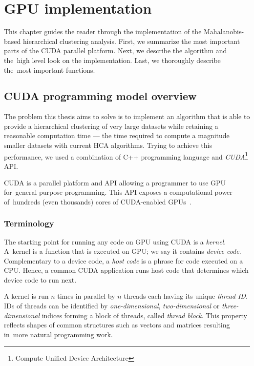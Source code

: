 \chapter{GPU implementation}

This chapter guides the reader through the implementation of the Mahalanobis-based hierarchical clustering analysis. First, we summarize the most important parts of the CUDA parallel platform. Next, we describe the algorithm and the~high level look on the implementation. Last, we thoroughly describe the~most important functions.

\section{CUDA programming model overview}

The problem this thesis aims to solve is to implement an algorithm that is able to provide a hierarchical clustering of very large datasets while retaining a reasonable computation time --- the time required to compute a magnitude smaller datasets with current HCA algorithms.
Trying to achieve this performance, we used a combination of C++ programming language and \emph{CUDA}\footnote{Compute Unified Device Architecture} API.

CUDA is a parallel platform and API allowing a programmer to use GPU for~general purpose programming. This API exposes a computational power of~hundreds (even thousands) cores of CUDA-enabled GPUs~\cite{cuda}.


\subsection{Terminology}

The starting point for running any code on GPU using CUDA is a \emph{kernel}. A~kernel is a function that is executed on GPU; we say it contains \emph{device code}. Complementary to a device code, a \emph{host code} is a phrase for code executed on a CPU. Hence, a common CUDA application runs host code that determines which device code to run next. 

A kernel is run $n$ times in parallel by $n$ threads each having its unique \emph{thread ID}. IDs of threads can be identified by \emph{one-dimensional}, \emph{two-dimensional} or \emph{three-dimensional} indices forming a block of threads, called \emph{thread block}. This property reflects shapes of common structures such as vectors and matrices resulting in~more natural programming work.

